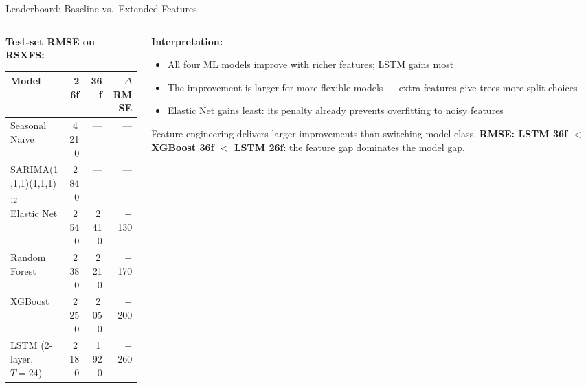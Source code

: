 \documentclass[aspectratio=169, 10pt]{beamer}
\begin{document}
\begin{frame}{Leaderboard: Baseline vs.\ Extended Features}
  \begin{columns}[T]
    \begin{column}{0.56\textwidth}
      \textbf{Test-set RMSE on RSXFS:}
      \begin{center}
      \footnotesize
      \begin{tabular}{lrrr}
        \toprule
        \textbf{Model}
          & \textbf{26f}
          & \textbf{36f}
          & $\Delta$RMSE \\
        \midrule
        Seasonal Na\"{i}ve       & 4\,210 & ---    & ---     \\
        SARIMA(1,1,1)(1,1,1)$_{12}$ & 2\,840 & ---  & ---   \\
        Elastic Net              & 2\,540 & 2\,410 & $-$130  \\
        Random Forest            & 2\,380 & 2\,210 & $-$170  \\
        XGBoost                  & 2\,250 & 2\,050 & $-$200  \\
        LSTM (2-layer, $T\!=\!24$)   & 2\,180 & 1\,920 & $-$260  \\
        \bottomrule
      \end{tabular}
      \end{center}
    \end{column}
    \begin{column}{0.40\textwidth}
      \textbf{Interpretation:}
      \begin{itemize}
        \item All four ML models improve with
              richer features; LSTM gains most
        \item The improvement is larger for more
              flexible models --- extra features
              give trees more split choices
        \item Elastic Net gains least: its
              penalty already prevents overfitting
              to noisy features
      \end{itemize}

      \medskip
      \begin{keybox}
        \footnotesize
        Feature engineering delivers larger
        improvements than switching model class.
        \textbf{RMSE: LSTM 36f $<$ XGBoost 36f $<$
        LSTM 26f}: the feature gap
        dominates the model gap.
      \end{keybox}
    \end{column}
  \end{columns}
\end{frame}
\end{document}
